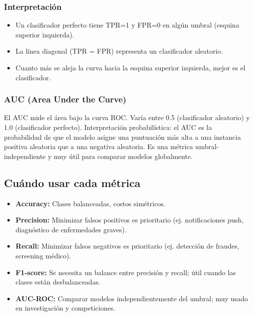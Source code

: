 \documentclass[12pt,a4paper,openany,oneside]{book}
\begin{document}
\subsubsection{Interpretación}
\begin{itemize}
    \item Un clasificador perfecto tiene TPR=1 y FPR=0 en algún umbral (esquina superior izquierda).
    \item La línea diagonal (TPR = FPR) representa un clasificador aleatorio.
    \item Cuanto más se aleja la curva hacia la esquina superior izquierda, mejor es el clasificador.
\end{itemize}

\subsubsection{AUC (Area Under the Curve)}
El AUC mide el área bajo la curva ROC. Varía entre 0.5 (clasificador aleatorio) y 1.0 (clasificador perfecto). Interpretación probabilística: el AUC es la probabilidad de que el modelo asigne una puntuación más alta a una instancia positiva aleatoria que a una negativa aleatoria. Es una métrica umbral-independiente y muy útil para comparar modelos globalmente.

\begin{center}
\caption{Ejemplo de curva ROC. El AUC es el área sombreada bajo la curva azul.}
\end{center}

\subsection{Cuándo usar cada métrica}
\begin{itemize}
    \item \textbf{Accuracy:} Clases balanceadas, costos simétricos.
    \item \textbf{Precision:} Minimizar falsos positivos es prioritario (ej. notificaciones push, diagnóstico de enfermedades graves).
    \item \textbf{Recall:} Minimizar falsos negativos es prioritario (ej. detección de fraudes, screening médico).
    \item \textbf{F1-score:} Se necesita un balance entre precisión y recall; útil cuando las clases están desbalanceadas.
    \item \textbf{AUC-ROC:} Comparar modelos independientemente del umbral; muy usado en investigación y competiciones.
\end{itemize}
\end{document}
